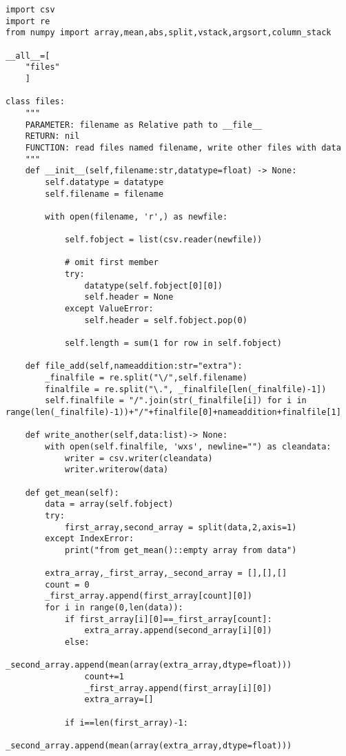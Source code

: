 \documentclass[draft,12pt]{article}
\begin{document}
\begin{verbatim}
import csv
import re
from numpy import array,mean,abs,split,vstack,argsort,column_stack

__all__=[
    "files"
    ]

class files:
    """
    PARAMETER: filename as Relative path to __file__
    RETURN: nil
    FUNCTION: read files named filename, write other files with data
    """
    def __init__(self,filename:str,datatype=float) -> None:
        self.datatype = datatype
        self.filename = filename

        with open(filename, 'r',) as newfile:
            
            self.fobject = list(csv.reader(newfile))
            
            # omit first member
            try:
                datatype(self.fobject[0][0])
                self.header = None
            except ValueError:
                self.header = self.fobject.pop(0)
                
            self.length = sum(1 for row in self.fobject)
            
    def file_add(self,nameaddition:str="extra"):
        _finalfile = re.split("\/",self.filename)
        finalfile = re.split("\.", _finalfile[len(_finalfile)-1])
        self.finalfile = "/".join(str(_finalfile[i]) for i in range(len(_finalfile)-1))+"/"+finalfile[0]+nameaddition+finalfile[1]
    
    def write_another(self,data:list)-> None:
        with open(self.finalfile, 'wxs', newline="") as cleandata:
            writer = csv.writer(cleandata)
            writer.writerow(data)
    
    def get_mean(self):
        data = array(self.fobject)
        try:
            first_array,second_array = split(data,2,axis=1)
        except IndexError:
            print("from get_mean()::empty array from data")
            
        extra_array,_first_array,_second_array = [],[],[]
        count = 0
        _first_array.append(first_array[count][0])
        for i in range(0,len(data)):
            if first_array[i][0]==_first_array[count]:
                extra_array.append(second_array[i][0])
            else:
                _second_array.append(mean(array(extra_array,dtype=float)))
                count+=1
                _first_array.append(first_array[i][0])
                extra_array=[]

            if i==len(first_array)-1:
                _second_array.append(mean(array(extra_array,dtype=float)))


\end{verbatim}
\end{document}
